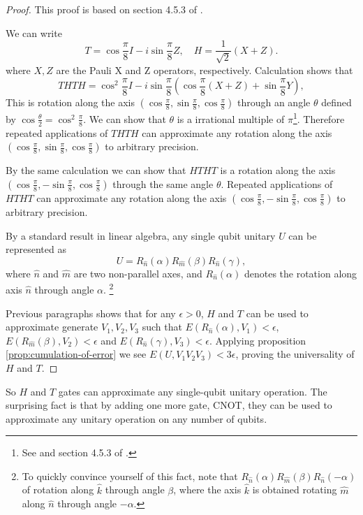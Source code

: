 \begin{proof}
	This proof is based on section 4.5.3 of \cite{Nielsen_Chuang_2010}.

	We can write
	$$
	T = \cos \frac{\pi}{8} I - i \sin \frac{\pi}{8} Z, \quad H = \frac{1}{\sqrt{2}} (X + Z).
	$$
	where $X, Z$ are the Pauli X and Z operators, respectively. 
	Calculation shows that 
	$$
	THTH = \cos^2\frac{\pi}{8} I - i \sin \frac{\pi}{8} \left( \cos \frac{\pi}{8} (X + Z) + \sin \frac{\pi}{8} Y \right),
	$$
	This is rotation along the axis $(\cos\frac{\pi}{8}, \sin\frac{\pi}{8}, \cos\frac{\pi}{8})$ through an angle $\theta$ defined by $\cos \frac{\theta}{2} = \cos^2 \frac{\pi}{8}$.
	We can show that $\theta$ is a irrational multiple of $\pi$\footnote{See \cite{boykin1999} and section 4.5.3 of \cite{Nielsen_Chuang_2010}. }.
	Therefore repeated applications of $THTH$ can approximate any rotation along the axis $(\cos\frac{\pi}{8}, \sin\frac{\pi}{8}, \cos\frac{\pi}{8})$ to arbitrary precision.

	By the same calculation we can show that $HTHT$ is a rotation along the axis $(\cos\frac{\pi}{8}, -\sin\frac{\pi}{8}, \cos\frac{\pi}{8})$ through the same angle $\theta$. 
	Repeated applications of $HTHT$ can approximate any rotation along the axis $(\cos\frac{\pi}{8}, -\sin\frac{\pi}{8}, \cos\frac{\pi}{8})$ to arbitrary precision.

	By a standard result in linear algebra, any single qubit unitary $U$ can be represented as
	$$
	U = R_{\hat{n}}(\alpha) R_{\hat{m}}(\beta) R_{\hat{n}}(\gamma),
	$$
	where $\hat{n}$ and $\hat{m}$ are two non-parallel axes, and $R_{\hat{n}}(\alpha)$ denotes the rotation along axis $\hat{n}$ through angle $\alpha$. \footnote{
		To quickly convince yourself of this fact, note that $R_{\hat{n}}(\alpha) R_{\hat{m}}(\beta) R_{\hat{n}}(-\alpha)$ of rotation along $\hat{k}$ through angle $\beta$, where the axis $\hat{k}$ is obtained rotating $\hat{m}$ along $\hat{n}$ through angle $-\alpha$.
	}

	Previous paragraphs shows that for any $\epsilon > 0$, $H$ and $T$ can be used to approximate generate $V_1, V_2, V_3$ such that $E(R_{\hat{n}}(\alpha), V_1) < \epsilon$, $E(R_{\hat{m}}(\beta), V_2) < \epsilon$ and $E(R_{\hat{n}}(\gamma), V_3) < \epsilon$.
	Applying proposition \ref{prop:cumulation-of-error} we see $E(U, V_1 V_2 V_3) < 3 \epsilon$, proving the universality of $H$ and $T$.
\end{proof}

So $H$ and $T$ gates can approximate any single-qubit unitary operation.
The surprising fact is that by adding one more gate, CNOT, they can be used to approximate any unitary operation on any number of qubits. 

